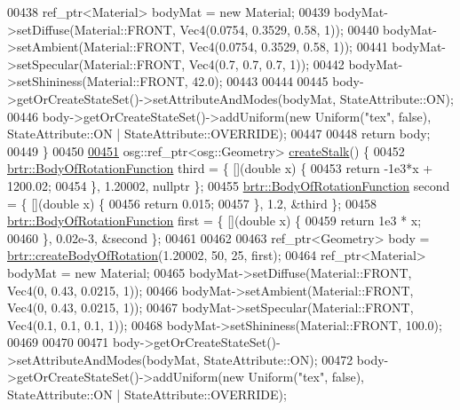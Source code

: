 \begin{DoxyCode}
00438         ref\_ptr<Material> bodyMat = \textcolor{keyword}{new} Material;
00439         bodyMat->setDiffuse(Material::FRONT, Vec4(0.0754, 0.3529, 0.58, 1));
00440         bodyMat->setAmbient(Material::FRONT, Vec4(0.0754, 0.3529, 0.58, 1));
00441         bodyMat->setSpecular(Material::FRONT, Vec4(0.7, 0.7, 0.7, 1));
00442         bodyMat->setShininess(Material::FRONT, 42.0);
00443 
00444 
00445         body->getOrCreateStateSet()->setAttributeAndModes(bodyMat, StateAttribute::ON);
00446         body->getOrCreateStateSet()->addUniform(\textcolor{keyword}{new} Uniform(\textcolor{stringliteral}{"tex"}, \textcolor{keyword}{false}), StateAttribute::ON | 
      StateAttribute::OVERRIDE);
00447 
00448         \textcolor{keywordflow}{return} body;
00449     \}
00450 
\hypertarget{_util_functions_8cpp_source_l00451}{}\hyperlink{namespacebrtr_a4ccd9746e37278e47832da270dc00fb3}{00451}     osg::ref\_ptr<osg::Geometry> \hyperlink{namespacebrtr_a4ccd9746e37278e47832da270dc00fb3}{createStalk}() \{
00452         \hyperlink{structbrtr_1_1_body_of_rotation_function}{brtr::BodyOfRotationFunction} third = \{ [](\textcolor{keywordtype}{double} x) \{
00453             \textcolor{keywordflow}{return} -1e3*x + 1200.02;
00454         \}, 1.20002, \textcolor{keyword}{nullptr} \};
00455         \hyperlink{structbrtr_1_1_body_of_rotation_function}{brtr::BodyOfRotationFunction} second = \{ [](\textcolor{keywordtype}{double} x) \{
00456             \textcolor{keywordflow}{return} 0.015;
00457         \}, 1.2, &third \};
00458         \hyperlink{structbrtr_1_1_body_of_rotation_function}{brtr::BodyOfRotationFunction} first = \{ [](\textcolor{keywordtype}{double} x) \{
00459             \textcolor{keywordflow}{return} 1e3 * x;
00460         \}, 0.02e-3, &second \};
00461 
00462 
00463         ref\_ptr<Geometry> body = \hyperlink{namespacebrtr_a83d3e627c9dc247459610aa9fec23d7b}{brtr::createBodyOfRotation}(1.20002, 50, 25, 
      first);
00464         ref\_ptr<Material> bodyMat = \textcolor{keyword}{new} Material;
00465         bodyMat->setDiffuse(Material::FRONT, Vec4(0, 0.43, 0.0215, 1));
00466         bodyMat->setAmbient(Material::FRONT, Vec4(0, 0.43, 0.0215, 1));
00467         bodyMat->setSpecular(Material::FRONT, Vec4(0.1, 0.1, 0.1, 1));
00468         bodyMat->setShininess(Material::FRONT, 100.0);
00469 
00470 
00471         body->getOrCreateStateSet()->setAttributeAndModes(bodyMat, StateAttribute::ON);
00472         body->getOrCreateStateSet()->addUniform(\textcolor{keyword}{new} Uniform(\textcolor{stringliteral}{"tex"}, \textcolor{keyword}{false}), StateAttribute::ON | 
      StateAttribute::OVERRIDE);

\end{DoxyCode}
